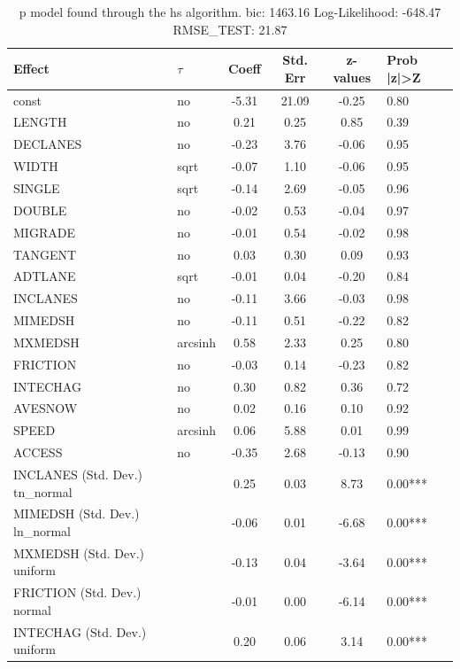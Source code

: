 \begin{table}
	\caption{p model found through the hs algorithm. bic: 1463.16 Log-Likelihood: -648.47 RMSE_TEST: 21.87}
	\begin{center}
		\begin{tabular}{|l|l|c|c|c|l|}
			\hline
			Effect & $\tau$ & Coeff & Std. Err & z-values & Prob |z|>Z \\
			\hline
			const & no & -5.31 & 21.09 & -0.25 & 0.80 \\
			\hline
			LENGTH & no & 0.21 & 0.25 & 0.85 & 0.39 \\
			\hline
			DECLANES & no & -0.23 & 3.76 & -0.06 & 0.95 \\
			\hline
			WIDTH & sqrt & -0.07 & 1.10 & -0.06 & 0.95 \\
			\hline
			SINGLE & sqrt & -0.14 & 2.69 & -0.05 & 0.96 \\
			\hline
			DOUBLE & no & -0.02 & 0.53 & -0.04 & 0.97 \\
			\hline
			MIGRADE & no & -0.01 & 0.54 & -0.02 & 0.98 \\
			\hline
			TANGENT & no & 0.03 & 0.30 & 0.09 & 0.93 \\
			\hline
			ADTLANE & sqrt & -0.01 & 0.04 & -0.20 & 0.84 \\
			\hline
			INCLANES & no & -0.11 & 3.66 & -0.03 & 0.98 \\
			\hline
			MIMEDSH & no & -0.11 & 0.51 & -0.22 & 0.82 \\
			\hline
			MXMEDSH & arcsinh & 0.58 & 2.33 & 0.25 & 0.80 \\
			\hline
			FRICTION & no & -0.03 & 0.14 & -0.23 & 0.82 \\
			\hline
			INTECHAG & no & 0.30 & 0.82 & 0.36 & 0.72 \\
			\hline
			AVESNOW & no & 0.02 & 0.16 & 0.10 & 0.92 \\
			\hline
			SPEED & arcsinh & 0.06 & 5.88 & 0.01 & 0.99 \\
			\hline
			ACCESS & no & -0.35 & 2.68 & -0.13 & 0.90 \\
			\hline
			INCLANES (Std. Dev.) tn_normal &  & 0.25 & 0.03 & 8.73 & 0.00*** \\
			\hline
			MIMEDSH (Std. Dev.) ln_normal &  & -0.06 & 0.01 & -6.68 & 0.00*** \\
			\hline
			MXMEDSH (Std. Dev.) uniform &  & -0.13 & 0.04 & -3.64 & 0.00*** \\
			\hline
			FRICTION (Std. Dev.) normal &  & -0.01 & 0.00 & -6.14 & 0.00*** \\
			\hline
			INTECHAG (Std. Dev.) uniform &  & 0.20 & 0.06 & 3.14 & 0.00*** \\

\end{tabular}
\end{center}
\end{table}
